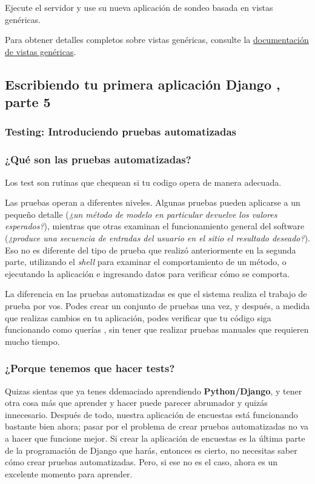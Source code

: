 \documentclass[10pt]{article}
\newcommand{\django}[1]{{\textcolor{G}{Django} #1}}
\begin{document}
Ejecute el servidor y use su nueva aplicación de sondeo basada en vistas genéricas.

Para obtener detalles completos sobre vistas genéricas, consulte la {\href{https://docs.djangoproject.com/en/3.0/topics/class-based-views/}{\textcolor{B}{ documentación de vistas genéricas}}}.

\newpage
\subsection{Escribiendo tu primera aplicación \django{}, parte 5}
\subsubsection{Testing: Introduciendo pruebas automatizadas}
\subsubsection*{¿Qué son las pruebas automatizadas?}

Los test son rutinas que chequean si tu codigo opera de manera adecuada.

Las pruebas operan a diferentes niveles. Algunas pruebas pueden aplicarse a un pequeño detalle (\textit{¿un método de modelo en particular devuelve los valores esperados?}), mientras que otras examinan el funcionamiento general del software (\textit{¿produce una secuencia de entradas del usuario en el sitio el resultado deseado?}). Eso no es diferente del tipo de prueba que realizó anteriormente en la segunda parte, utilizando el \textit{shell} para examinar el comportamiento de un método, o ejecutando la aplicación e ingresando datos para verificar cómo se comporta.

La diferencia en las pruebas automatizadas es que el sistema realiza el trabajo de prueba por vos. Podes crear un conjunto de pruebas una vez, y después, a medida que realizas cambios en tu aplicación, podes verificar que tu código siga funcionando como querías , sin tener que realizar pruebas manuales que requieren mucho tiempo.

\subsubsection*{¿Porque tenemos que hacer tests?}
Quizas sientas que ya tenes ddemaciado aprendiendo \textbf{Python/Django}, y tener otra cosa más que aprender y hacer puede parecer abrumador y quizás innecesario. Después de todo, nuestra aplicación de encuestas está funcionando bastante bien ahora; pasar por el problema de crear pruebas automatizadas no va a hacer que funcione mejor. Si crear la aplicación de encuestas es la última parte de la programación de \django{} que harás, entonces es cierto, no necesitas saber cómo crear pruebas automatizadas. Pero, si ese no es el caso, ahora es un excelente momento para aprender.
\end{document}
